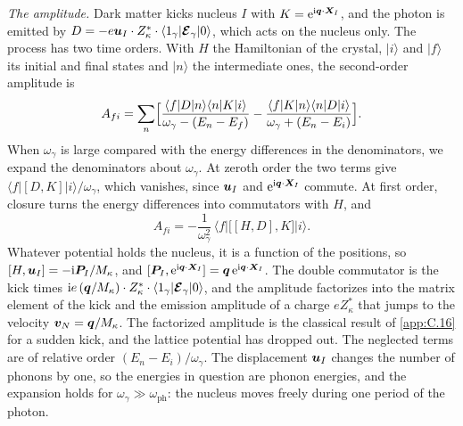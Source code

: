 \emph{The amplitude.} Dark matter kicks nucleus $I$ with $K = \mathrm{e}^{\mathrm{i}\bm{q}\cdot\bm{X}_I}$, and the photon is emitted by $D = -e\bm{u}_I\cdot Z^*_\kappa\cdot\langle1_\gamma|\bm{\mathcal{E}}_\gamma|0\rangle$, which acts on the nucleus only. The process has two time orders. With $H$ the Hamiltonian of the crystal, $|i\rangle$ and $|f\rangle$ its initial and final states and $|n\rangle$ the intermediate ones, the second-order amplitude is
\begin{equation*}
  A_{fi} = \sum_n\Bigl[\frac{\langle f|D|n\rangle\langle n|K|i\rangle}{\omega_\gamma - (E_n - E_f)} - \frac{\langle f|K|n\rangle\langle n|D|i\rangle}{\omega_\gamma + (E_n - E_i)}\Bigr] .
\end{equation*}
When $\omega_\gamma$ is large compared with the energy differences in the denominators, we expand the denominators about $\omega_\gamma$. At zeroth order the two terms give $\langle f|[D,K]|i\rangle/\omega_\gamma$, which vanishes, since $\bm{u}_I$ and $\mathrm{e}^{\mathrm{i}\bm{q}\cdot\bm{X}_I}$ commute. At first order, closure turns the energy differences into commutators with $H$, and
\begin{equation*}
  A_{fi} = -\frac{1}{\omega_\gamma^2}\,\langle f|\bigl[[H,D],K\bigr]|i\rangle .
\end{equation*}
Whatever potential holds the nucleus, it is a function of the positions, so $[H,\bm{u}_I] = -\mathrm{i}\bm{P}_I/M_\kappa$, and $[\bm{P}_I,\mathrm{e}^{\mathrm{i}\bm{q}\cdot\bm{X}_I}] = \bm{q}\,\mathrm{e}^{\mathrm{i}\bm{q}\cdot\bm{X}_I}$. The double commutator is the kick times $\mathrm{i} e\,(\bm{q}/M_\kappa)\cdot Z^*_\kappa\cdot\langle1_\gamma|\bm{\mathcal{E}}_\gamma|0\rangle$, and the amplitude factorizes into the matrix element of the kick and the emission amplitude of a charge $eZ^*_\kappa$ that jumps to the velocity $\bm{v}_N = \bm{q}/M_\kappa$. The factorized amplitude is the classical result of \cref{app:C.16} for a sudden kick, and the lattice potential has dropped out. The neglected terms are of relative order $(E_n - E_i)/\omega_\gamma$. The displacement $\bm{u}_I$ changes the number of phonons by one, so the energies in question are phonon energies, and the expansion holds for $\omega_\gamma \gg \omega_{\mathrm{ph}}$: the nucleus moves freely during one period of the photon.

